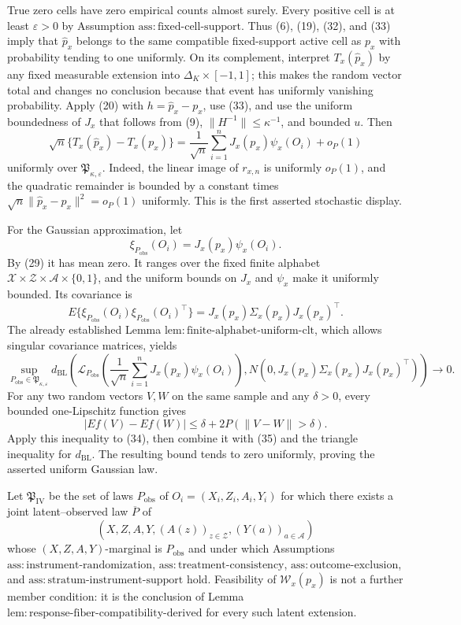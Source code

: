 True zero cells have zero empirical counts almost surely.  Every positive
cell is at least \(\varepsilon>0\) by Assumption
\(\mathrm{ass{:}fixed\mbox{-}cell\mbox{-}support}\).  Thus (6), (19),
(32), and (33) imply that \(\widehat p_x\) belongs to the same compatible
fixed-support active cell as \(p_x\) with probability tending to one
uniformly.  On its complement, interpret \(T_x(\widehat p_x)\) by any fixed
measurable extension into \(\Delta_K\times[-1,1]\); this makes the random
vector total and changes no conclusion because that event has uniformly
vanishing probability.  Apply (20) with
\(h=\widehat p_x-p_x\), use (33), and use the uniform boundedness of \(J_x\)
that follows from (9), \(\|H^{-1}\|\leq\kappa^{-1}\), and bounded \(u\).
Then
\[
 \sqrt n\{T_x(\widehat p_x)-T_x(p_x)\}
 =\frac1{\sqrt n}\sum_{i=1}^nJ_x(p_x)\psi_x(O_i)+o_P(1)
 \tag{34}
\]
uniformly over \(\mathfrak P_{\kappa,\varepsilon}\).  Indeed, the linear
image of \(r_{x,n}\) is uniformly \(o_P(1)\), and the quadratic remainder is
bounded by a constant times
\(\sqrt n\|\widehat p_x-p_x\|^2=o_P(1)\) uniformly.  This is the first
asserted stochastic display.

For the Gaussian approximation, let
\[
 \xi_{P_{\mathrm{obs}}}(O_i)=J_x(p_x)\psi_x(O_i).
\]
By (29) it has mean zero.  It ranges over the fixed finite alphabet
\(\mathcal X\times\mathcal Z\times\mathcal A\times\{0,1\}\), and the
uniform bounds on \(J_x\) and \(\psi_x\) make it uniformly bounded.  Its
covariance is
\[
 E\{\xi_{P_{\mathrm{obs}}}(O_i)\xi_{P_{\mathrm{obs}}}(O_i)^\top\}
 =J_x(p_x)\Sigma_x(p_x)J_x(p_x)^\top.
\]
The already established Lemma
\(\mathrm{lem{:}finite\mbox{-}alphabet\mbox{-}uniform\mbox{-}clt}\), which
allows singular covariance matrices, yields
\[
 \sup_{P_{\mathrm{obs}}\in\mathfrak P_{\kappa,\varepsilon}}
 d_{\mathrm{BL}}\!\left(
 \mathcal L_{P_{\mathrm{obs}}}\!\left(
  \frac1{\sqrt n}\sum_{i=1}^nJ_x(p_x)\psi_x(O_i)\right),
 N\!\left(0,J_x(p_x)\Sigma_x(p_x)J_x(p_x)^\top\right)
 \right)\longrightarrow0.
 \tag{35}
\]
For any two random vectors \(V,W\) on the same sample and any
\(\delta>0\), every bounded one-Lipschitz function gives
\[
 |Ef(V)-Ef(W)|\leq\delta+2P(\|V-W\|>\delta).
\]
Apply this inequality to (34), then combine it with (35) and the triangle
inequality for \(d_{\mathrm{BL}}\).  The resulting bound tends to zero
uniformly, proving the asserted uniform Gaussian law.

Let \(\mathfrak P_{\mathrm{IV}}\) be the set of laws
\(P_{\mathrm{obs}}\) of \(O_i=(X_i,Z_i,A_i,Y_i)\) for which there exists a
joint latent--observed law \(\overline P\) of
\[
 \left(X,Z,A,Y,(A(z))_{z\in\mathcal Z},(Y(a))_{a\in\mathcal A}\right)
\]
whose \((X,Z,A,Y)\)-marginal is \(P_{\mathrm{obs}}\) and under which
Assumptions \(\mathrm{ass{:}instrument\mbox{-}randomization}\),
\(\mathrm{ass{:}treatment\mbox{-}consistency}\),
\(\mathrm{ass{:}outcome\mbox{-}exclusion}\), and
\(\mathrm{ass{:}stratum\mbox{-}instrument\mbox{-}support}\) hold.  Feasibility
of \(\mathcal W_x(p_x)\) is not a further member condition: it is the
conclusion of Lemma
\(\mathrm{lem{:}response\mbox{-}fiber\mbox{-}compatibility\mbox{-}derived}\)
for every such latent extension.


